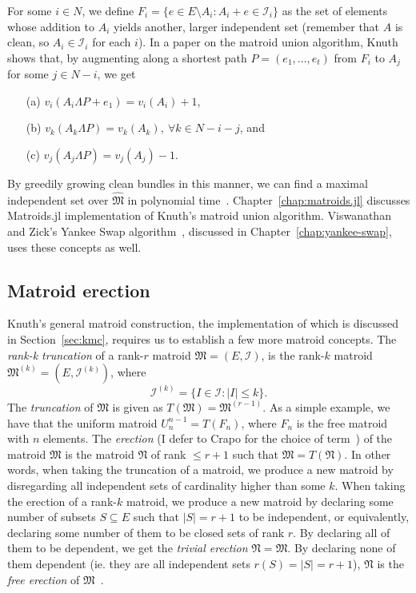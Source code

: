 For some $i\in N$, we define $F_i = \{ e\in E\setminus A_i : A_i + e \in \mathcal{I}_i \}$ as the set of elements whose addition to $A_i$ yields another, larger independent set (remember that $A$ is clean, so $A_i\in\mathcal{I}_i$ for each $i$). In a paper on the matroid union algorithm, Knuth~\cite{knuth1973matroidpartitioning} shows that, by augmenting along a shortest path $P = (e_1,\dots,e_t)$ from $F_i$ to $A_j$ for some $j \in N - i$, we get
\begin{enumerate}
  \item[(a)] $v_i(A_i\Lambda P + e_1) = v_i(A_i) + 1$,
  \item[(b)] $v_k(A_k\Lambda P) = v_k(A_k),\ \forall k\in N - i - j$, and
  \item[(c)] $v_j(A_j\Lambda P) = v_j(A_j) - 1$.
\end{enumerate}
By greedily growing clean bundles in this manner, we can find a maximal independent set over $\widehat{\mathfrak{M}}$ in polynomial time~\cite{schrijver-2003}. Chapter~\ref{chap:matroids.jl} discusses Matroids.jl implementation of Knuth's matroid union algorithm. Viswanathan and Zick's Yankee Swap algorithm~\cite{viswanathan2023yankee}, discussed in Chapter~\ref{chap:yankee-swap}, uses these concepts as well.

\subsection{Matroid erection}
Knuth's general matroid construction, the implementation of which is discussed in Section~\ref{sec:kmc}, requires us to establish a few more matroid concepts. The \textit{rank-k truncation} of a rank-$r$ matroid $\mathfrak{M} = (E, \mathcal{I})$, is the rank-$k$ matroid $\mathfrak{M}^{(k)} = (E, \mathcal{I}^{(k)})$, where
$$\mathcal{I}^{(k)} = \{ I \in \mathcal{I} : |I| \leq k \}.$$
The \textit{truncation} of $\mathfrak{M}$ is given as $T(\mathfrak{M}) = \mathfrak{M}^{(r-1)}$. As a simple example, we have that the uniform matroid $U_n^{n-1} = T(F_n)$, where $F_n$ is the free matroid with $n$ elements. The \textit{erection} (I defer to Crapo for the choice of term~\cite{Crapo1970}) of the matroid $\mathfrak{M}$ is the matroid $\mathfrak{N}$ of rank $\leq r+1$ such that $\mathfrak{M} = T(\mathfrak{N})$. In other words, when taking the truncation of a matroid, we produce a new matroid by disregarding all independent sets of cardinality higher than some $k$. When taking the erection of a rank-$k$ matroid, we produce a new matroid by declaring some number of subsets $S \subseteq E$ such that $|S|=r+1$ to be independent, or equivalently, declaring some number of them to be closed sets of rank $r$. By declaring all of them to be dependent, we get the \textit{trivial erection} $\mathfrak{N} = \mathfrak{M}$. By declaring none of them dependent (ie. they are all independent sets $r(S) = |S| = r+1$), $\mathfrak{N}$ is the \textit{free erection} of $\mathfrak{M}$~\cite{greene-1991}.

